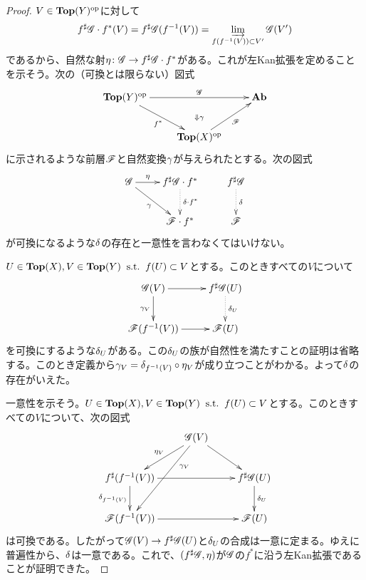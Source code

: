   \begin{proof}
    $V \in \textbf{Top}(Y)^{\text{op}}$に対して
    \[
    f^{\sharp}\mathscr{G} \cdot f^*(V) =  f^{\sharp}\mathscr{G} (f^{-1}(V)) = \operatorname*{\varinjlim}_{f(f^{-1}(V)) \subset V'} \mathscr{G}(V')
    \]
    であるから、自然な射$\eta \colon \mathscr{G} \to f^{\sharp}\mathscr{G} \cdot f^*$がある。これが左Kan拡張を定めることを示そう。次の（可換とは限らない）図式
\[
\xymatrix{
\Top(Y)\op \ar[dr]_-{f^*} \ar[rr]^-{\scrg} & {} \ar@{}[d]|{\Downarrow \grg}  & \Ab \\
{} & \Top(X)\op \ar[ru]_-{\scrf} & {}
}
\]
に示されるような前層$\mathscr{F}$と自然変換${\gamma}$が与えられたとする。次の図式
\[
\xymatrix{
\scrg \ar[rd]_-{\grg} \ar[r]^-{\eta} & f\sh \scrg \cdot f^* \ar@{.>}[d]^-{\grd \cdot f^*} & f\sh \scrg \ar@{.>}[d]^-{\grd} \\
{} & \scrf \cdot f^* & \scrf
}
\]
が可換になるような${\delta}$の存在と一意性を言わなくてはいけない。

$U \in \textbf{Top}(X),V \in \textbf{Top}(Y)  \; \; \text{s.t.} \; \; f(U) \subset V$とする。このときすべての$V$について
\[
\xymatrix{
\scrg(V) \ar[d]_{\grg_V} \ar[r] & f\sh \scrg (U) \ar@{.>}[d]^-{\grd_U} \\
\scrf(f^{-1}(V)) \ar[r] & \scrf(U)
}
\]
を可換にするような${\delta}_U$がある。この${\delta}_U$の族が自然性を満たすことの証明は省略する。このとき定義から${\gamma}_V = {\delta}_{f^{-1}(V)} \circ \eta_V$が成り立つことがわかる。よって${\delta}$の存在がいえた。

一意性を示そう。$U \in \textbf{Top}(X),V \in \textbf{Top}(Y)  \; \; \text{s.t.} \; \; f(U) \subset V$とする。このときすべての$V$について、次の図式
\[
\xymatrix{
{} & \scrg(V) \ar[dl]_-{\eta_V} \ar[dr] \ar[ddl]^(.3){\grg_V} & {} \\
f\sh (f^{-1}(V) ) \ar[rr] \ar[d]_-{\grd_{ f^{-1}(V) }} & {} & f\sh \scrg(U) \ar[d]^-{\grd_U} \\
\scrf( f^{-1}(V) )  \ar[rr] & {} & \scrf(U)
}
\]
は可換である。したがって$\mathscr{G}(V) \to f^{\sharp} \mathscr{G}(U)$と${\delta}_U$の合成は一意に定まる。ゆえに普遍性から、${\delta}$は一意である。これで、$(f^{\sharp} \mathscr{G}, \eta)$が$\mathscr{G}$の$f^*$に沿う左Kan拡張であることが証明できた。
  \end{proof}
